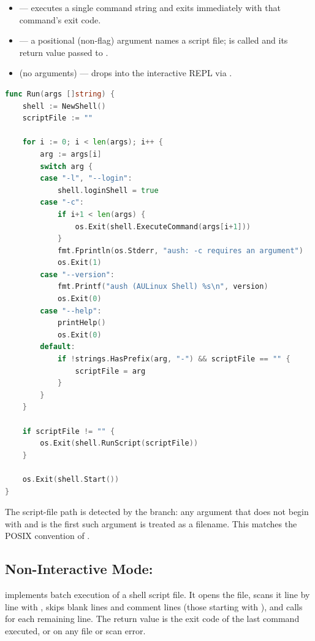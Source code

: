 \begin{itemize}
  \item {} --- executes a single command string and exits
        immediately with that command's exit code.
  \item {} --- a positional (non-flag) argument names a script
        file;  is called and its return value passed to
        .
  \item (no arguments) --- drops into the interactive REPL via .
\end{itemize}

\begin{lstlisting}[language=Go, caption={Argument parsing and mode dispatch in Run() (shell/shell.go)}]
func Run(args []string) {
    shell := NewShell()
    scriptFile := ""

    for i := 0; i < len(args); i++ {
        arg := args[i]
        switch arg {
        case "-l", "--login":
            shell.loginShell = true
        case "-c":
            if i+1 < len(args) {
                os.Exit(shell.ExecuteCommand(args[i+1]))
            }
            fmt.Fprintln(os.Stderr, "aush: -c requires an argument")
            os.Exit(1)
        case "--version":
            fmt.Printf("aush (AULinux Shell) %s\n", version)
            os.Exit(0)
        case "--help":
            printHelp()
            os.Exit(0)
        default:
            if !strings.HasPrefix(arg, "-") && scriptFile == "" {
                scriptFile = arg
            }
        }
    }

    if scriptFile != "" {
        os.Exit(shell.RunScript(scriptFile))
    }

    os.Exit(shell.Start())
}
\end{lstlisting}

The script-file path is detected by the  branch: any argument that
does not begin with \code{-} and is the first such argument is treated as a
filename. This matches the POSIX convention of .

\subsection{Non-Interactive Mode: }

 implements batch execution of a shell script file. It opens the
file, scans it line by line with , skips blank lines and
comment lines (those starting with \code{\#}), and calls 
for each remaining line. The return value is the exit code of the last command
executed, or  on any file or scan error.

